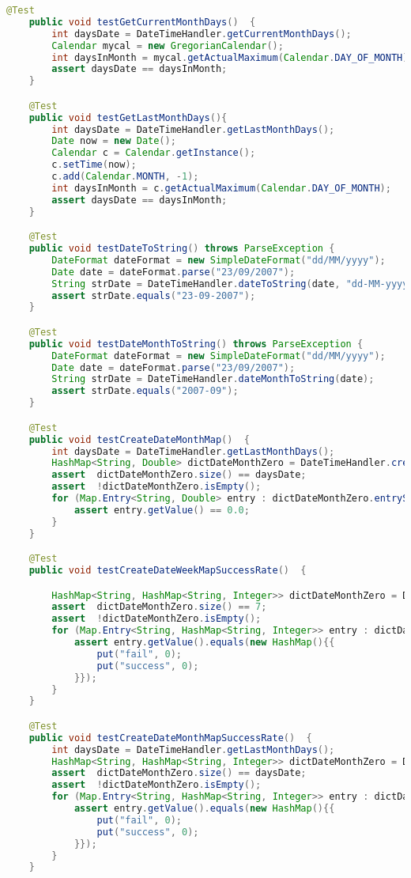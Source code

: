\begin{lstlisting}[language=Java]
    @Test
    public void testGetCurrentMonthDays()  {
        int daysDate = DateTimeHandler.getCurrentMonthDays();
        Calendar mycal = new GregorianCalendar();
        int daysInMonth = mycal.getActualMaximum(Calendar.DAY_OF_MONTH);
        assert daysDate == daysInMonth;
    }

    @Test
    public void testGetLastMonthDays(){
        int daysDate = DateTimeHandler.getLastMonthDays();
        Date now = new Date();
        Calendar c = Calendar.getInstance();
        c.setTime(now);
        c.add(Calendar.MONTH, -1);
        int daysInMonth = c.getActualMaximum(Calendar.DAY_OF_MONTH);
        assert daysDate == daysInMonth;
    }

    @Test
    public void testDateToString() throws ParseException {
        DateFormat dateFormat = new SimpleDateFormat("dd/MM/yyyy");
        Date date = dateFormat.parse("23/09/2007");
        String strDate = DateTimeHandler.dateToString(date, "dd-MM-yyyy");
        assert strDate.equals("23-09-2007");
    }

    @Test
    public void testDateMonthToString() throws ParseException {
        DateFormat dateFormat = new SimpleDateFormat("dd/MM/yyyy");
        Date date = dateFormat.parse("23/09/2007");
        String strDate = DateTimeHandler.dateMonthToString(date);
        assert strDate.equals("2007-09");
    }

    @Test
    public void testCreateDateMonthMap()  {
        int daysDate = DateTimeHandler.getLastMonthDays();
        HashMap<String, Double> dictDateMonthZero = DateTimeHandler.createDateMonthMap();
        assert  dictDateMonthZero.size() == daysDate;
        assert  !dictDateMonthZero.isEmpty();
        for (Map.Entry<String, Double> entry : dictDateMonthZero.entrySet()) {
            assert entry.getValue() == 0.0;
        }
    }

    @Test
    public void testCreateDateWeekMapSuccessRate()  {

        HashMap<String, HashMap<String, Integer>> dictDateMonthZero = DateTimeHandler.createDateWeekMapSuccessRate();
        assert  dictDateMonthZero.size() == 7;
        assert  !dictDateMonthZero.isEmpty();
        for (Map.Entry<String, HashMap<String, Integer>> entry : dictDateMonthZero.entrySet()) {
            assert entry.getValue().equals(new HashMap(){{
                put("fail", 0);
                put("success", 0);
            }});
        }
    }

    @Test
    public void testCreateDateMonthMapSuccessRate()  {
        int daysDate = DateTimeHandler.getLastMonthDays();
        HashMap<String, HashMap<String, Integer>> dictDateMonthZero = DateTimeHandler.createDateMonthMapSuccessRate();
        assert  dictDateMonthZero.size() == daysDate;
        assert  !dictDateMonthZero.isEmpty();
        for (Map.Entry<String, HashMap<String, Integer>> entry : dictDateMonthZero.entrySet()) {
            assert entry.getValue().equals(new HashMap(){{
                put("fail", 0);
                put("success", 0);
            }});
        }
    }


\end{lstlisting}
